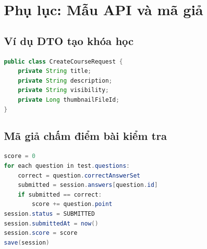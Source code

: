 \documentclass[12pt,a4paper]{report}
\begin{document}
\appendix
\chapter{Phụ lục: Mẫu API và mã giả}
\section{Ví dụ DTO tạo khóa học}
\begin{lstlisting}[language=Java,caption={Ví dụ cấu trúc request tạo khóa học}]
public class CreateCourseRequest {
    private String title;
    private String description;
    private String visibility;
    private Long thumbnailFileId;
}
\end{lstlisting}

\section{Mã giả chấm điểm bài kiểm tra}
\begin{lstlisting}[language=Java,caption={Mã giả chấm điểm phiên test}]
score = 0
for each question in test.questions:
    correct = question.correctAnswerSet
    submitted = session.answers[question.id]
    if submitted == correct:
        score += question.point
session.status = SUBMITTED
session.submittedAt = now()
session.score = score
save(session)
\end{lstlisting}
\end{document}
